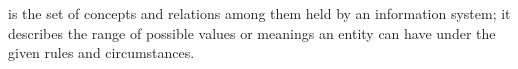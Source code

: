 \begin{definition}
    is the set of concepts and relations among them held by an information
    system; it describes the range of possible values or meanings an entity can
    have under the given rules and circumstances.

\end{definition}
